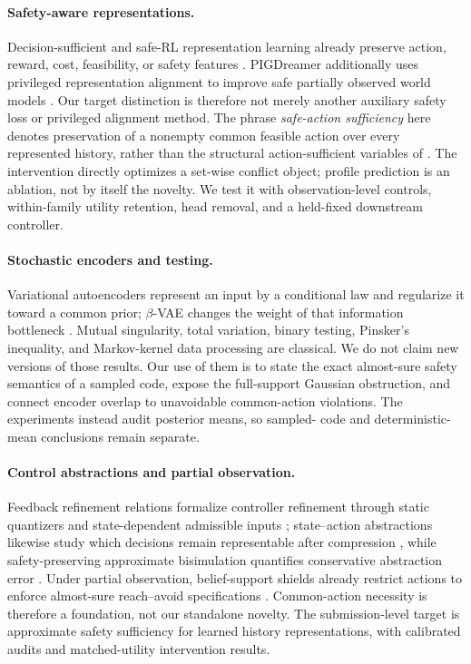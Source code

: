 \paragraph{Safety-aware representations.}
Decision-sufficient and safe-RL representation learning already preserve action, reward, cost,
feasibility, or safety features \citep{huang2022action,cen2024feasibility,wang2025cvrlbm,
yang2025qsupervised,mani2025safety}.  PIGDreamer additionally uses privileged representation
alignment to improve safe partially observed world models \citep{huang2025pigdreamer}.  Our target
distinction is therefore not merely another auxiliary safety loss or privileged alignment method.
The phrase \emph{safe-action sufficiency} here denotes preservation of a nonempty common feasible
action over every represented history, rather than the structural action-sufficient variables of
\citet{huang2022action}.  The intervention directly optimizes a set-wise conflict object; profile
prediction is an ablation, not by itself the novelty.  We test it with observation-level controls,
within-family utility retention, head removal, and a held-fixed downstream controller.

\paragraph{Stochastic encoders and testing.}
Variational autoencoders represent an input by a conditional law and regularize it toward a common
prior; $\beta$-VAE changes the weight of that information bottleneck
\citep{kingma2014autoencoding,higgins2017betavae}.  Mutual singularity, total variation, binary
testing, Pinsker's inequality, and Markov-kernel data processing are classical.  We do not claim
new versions of those results.  Our use of them is to state the exact almost-sure safety semantics
of a sampled code, expose the full-support Gaussian obstruction, and connect encoder overlap to
unavoidable common-action violations.  The experiments instead audit posterior means, so sampled-
code and deterministic-mean conclusions remain separate.

\paragraph{Control abstractions and partial observation.}
Feedback refinement relations formalize controller refinement through static quantizers and
state-dependent admissible inputs \citep{reissig2017feedback}; state--action abstractions likewise
study which decisions remain representable after compression \citep{abel2020value}, while
safety-preserving approximate bisimulation quantifies conservative abstraction error
\citep{girard2012safety}.  Under partial
observation, belief-support shields already restrict actions to enforce almost-sure reach--avoid
specifications \citep{sheng2024safe}.  Common-action necessity is therefore a foundation, not our
standalone novelty.  The submission-level target is approximate safety sufficiency for learned
history representations, with calibrated audits and matched-utility intervention results.

